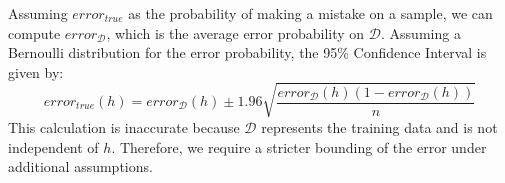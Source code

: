Assuming $error_{true}$ as the probability of making a mistake on a sample, we can compute $error_{\mathcal{D}}$, which is the average error probability on $\mathcal{D}$.
Assuming a Bernoulli distribution for the error probability, the 95\% Confidence Interval is given by:
\[error_{true}(h)=error_{\mathcal{D}}(h)\pm 1.96\sqrt{\dfrac{error_{\mathcal{D}}(h)(1-error_{\mathcal{D}}(h))}{n}}\]
This calculation is inaccurate because $\mathcal{D}$ represents the training data and is not independent of $h$. 
Therefore, we require a stricter bounding of the error under additional assumptions.










